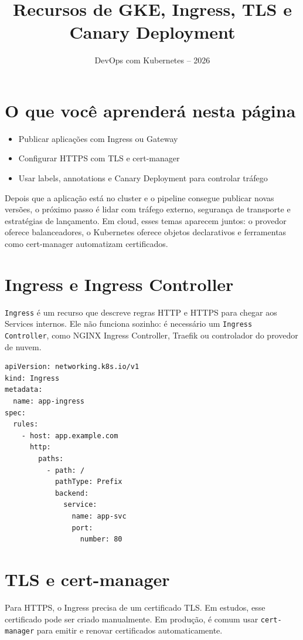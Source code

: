 \documentclass[11pt,a4paper]{article}
\title{\color{secondary}\Huge\textbf{Recursos de GKE, Ingress, TLS e Canary Deployment}}
\author{\color{primary}DevOps com Kubernetes -- 2026}
\date{}
\begin{document}
\maketitle


\section*{\color{primary}O que você aprenderá nesta página}
\begin{itemize}
\item Publicar aplicações com Ingress ou Gateway
\item Configurar HTTPS com TLS e cert-manager
\item Usar labels, annotations e Canary Deployment para controlar tráfego
\end{itemize}

Depois que a aplicação está no cluster e o pipeline consegue publicar novas versões, o próximo passo é lidar com tráfego externo, segurança de transporte e estratégias de lançamento. Em cloud, esses temas aparecem juntos: o provedor oferece balanceadores, o Kubernetes oferece objetos declarativos e ferramentas como cert-manager automatizam certificados.

\section*{\color{primary}Ingress e Ingress Controller}

\texttt{Ingress} é um recurso que descreve regras HTTP e HTTPS para chegar aos Services internos. Ele não funciona sozinho: é necessário um \texttt{Ingress Controller}, como NGINX Ingress Controller, Traefik ou controlador do provedor de nuvem.

\begin{lstlisting}[language=bash]
apiVersion: networking.k8s.io/v1
kind: Ingress
metadata:
  name: app-ingress
spec:
  rules:
    - host: app.example.com
      http:
        paths:
          - path: /
            pathType: Prefix
            backend:
              service:
                name: app-svc
                port:
                  number: 80
\end{lstlisting}

\section*{\color{primary}TLS e cert-manager}

Para HTTPS, o Ingress precisa de um certificado TLS. Em estudos, esse certificado pode ser criado manualmente. Em produção, é comum usar \texttt{cert-manager} para emitir e renovar certificados automaticamente.
\end{document}
